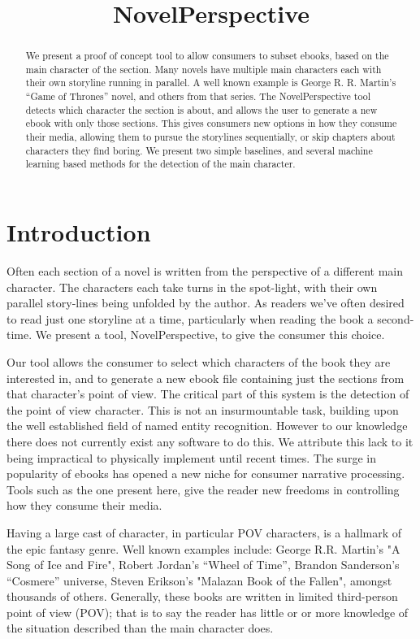 \documentclass[11pt,a4paper]{article}
\title{NovelPerspective}
\begin{document}
\maketitle

\begin{abstract}
We present a proof of concept tool to allow consumers to subset ebooks, based on the main character of the section.
Many novels have multiple main characters each with their own storyline running in parallel.
A well known example is George R. R. Martin's ``Game of Thrones'' novel, and others from that series.
The NovelPerspective tool detects which character the section is about,
and allows the user to generate a new ebook with only those sections.
This gives consumers new options in how they consume their media, allowing them to  pursue the storylines sequentially, or skip chapters about characters they find boring.
We present two simple baselines, and several machine learning based methods for the detection of the main character.
\end{abstract}

\section{Introduction}
Often each section of a novel is written  from the perspective of a different main character.
The characters each take turns in the spot-light,
with their own parallel story-lines being unfolded by the author.
As readers we've often desired to read just one storyline at a time, particularly when reading the book a second-time.
We present a tool, NovelPerspective, to give the consumer this choice.

Our tool allows the consumer to select which characters of the book they are interested in,
and to generate a new ebook file containing just the sections from that character's point of view.
The critical part of this system is the detection of the point of view character.
This is not an insurmountable task, building upon the well established field of named entity recognition.
However to our knowledge there does not currently exist any  software to do this.
We attribute this lack to it being impractical to physically implement until recent times.
The surge in popularity of ebooks has opened a new niche for consumer narrative processing.
Tools such as the one present here, give the reader new freedoms in controlling how they consume their media.

Having a large cast of character, in particular POV characters, is a hallmark of the epic fantasy genre.
Well known examples include: George R.R. Martin's "A Song of Ice and Fire", 
Robert Jordan's ``Wheel of Time'', Brandon Sanderson's ``Cosmere'' universe, 
Steven Erikson's "Malazan Book of the Fallen", amongst thousands of others.
Generally, these books are written in limited third-person point of view (POV);
that is to say the reader has little or or more knowledge of the situation described than the main character does.
\end{document}
